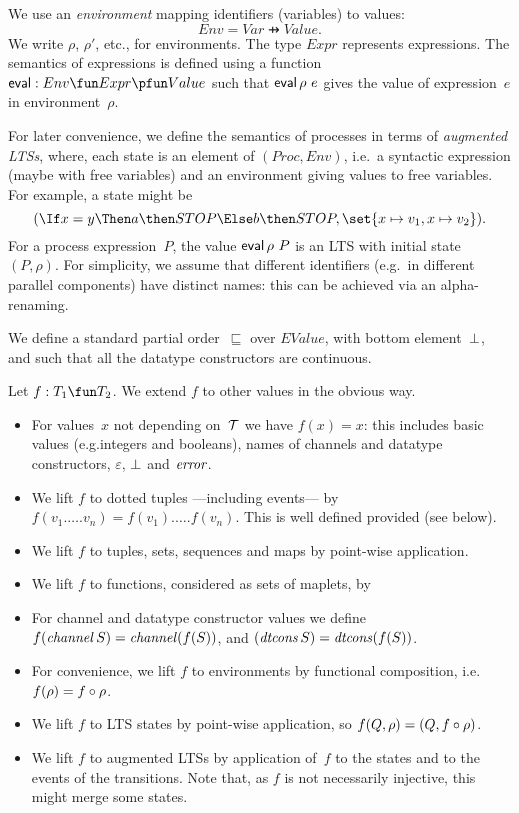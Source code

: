 We use an \emph{environment} mapping identifiers (variables) to values:
\[
Env = Var \pfun Value.
\]
We write $\rho$, $\rho'$, etc., for environments. 
The type $Expr$ represents expressions.  The semantics of expressions is
defined using a function $\eval : Env \fun Expr \pfun Value$ such that
$\mathop{\sf eval} \rho~e$ gives the value of expression~$e$ in environment~$\rho$.

For later convenience, we define the semantics of processes in terms of
\emph{augmented LTSs}, where, each state is an element of $(Proc, Env)$,
i.e.~a syntactic expression (maybe with free variables) and an environment
giving values to free variables.  For example, a state might be
\[
(\If x = y \Then a \then STOP \Else b \then STOP,
   \set{x \mapsto v_1, x \mapsto v_2}).
\]
For a process expression~$P$, the value $\mathop{\sf eval} \rho~P$ is an
LTS with initial state $(P,\rho)$.
For simplicity, we assume that different identifiers (e.g.~in different
parallel components) have distinct names: this can be achieved via an
alpha-renaming.  


We define a standard partial order~$\sqsubseteq$ over $EValue$, with bottom
element~$\perp$, and such that all the datatype constructors are continuous.

Let $f : T_1 \fun T_2$.  We extend $f$ to other
values in the obvious way.
\begin{itemize}
\item For values~$x$ not depending on~$\mathcal{T}$ we have $f(x) = x$: this includes
  basic values (e.g.integers and booleans), names of channels and datatype
  constructors, $\varepsilon$, $\perp$ and $\mathord{\it error}$.

\item We lift $f$ to dotted tuples ---including events--- by
  $f(v_1.\ldots.v_n) = f(v_1).\ldots.f(v_n)$.  This is well defined provided
   (see below).

\item We lift $f$ to tuples, sets, sequences and maps by point-wise
  application.

\item We lift $f$ to functions, considered as sets of maplets, by

\item For channel and datatype constructor values we define
  $f(\mathop{\it channel} S) = \mathop{\it channel} (f(S))$, and
  $(\mathop{\it dtcons} S) = \mathop{\it dtcons} (f(S))$.

\item For convenience, we lift $f$ to environments by functional
  composition, i.e.~$f(\rho) = f\circ\rho$.

\item We lift $f$ to LTS states by point-wise application, so $f(Q,\rho) =
  (Q, f\circ\rho)$. 

\item We lift $f$ to augmented LTSs by application of~$f$ to the states
  and to the events of the transitions.  Note that, as $f$ is not necessarily
  injective, this might merge some states. 
\end{itemize}


